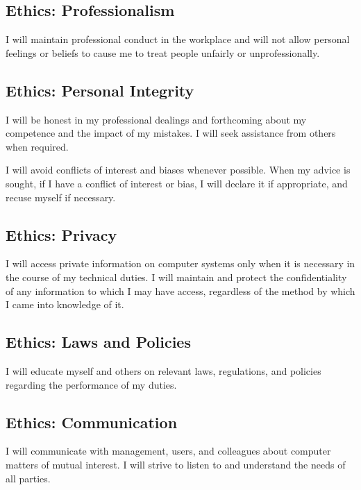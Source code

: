 \documentclass[xga]{xdvislides}
\begin{document}
\subsection{Ethics: Professionalism}
\vfill
\begin{center}
I will maintain professional conduct in the workplace and will not allow
personal feelings or beliefs to cause me to treat people unfairly or
unprofessionally.
\end{center}
\vfill

\subsection{Ethics: Personal Integrity}
\vfill
\begin{center}
I will be honest in my professional dealings and forthcoming about my
competence and the impact of my mistakes. I will seek assistance from
others when required. \\
\vspace{.5in}

I will avoid conflicts of interest and biases whenever possible. When my
advice is sought, if I have a conflict of interest or bias, I will declare
it if appropriate, and recuse myself if necessary.
\end{center}
\vfill


\subsection{Ethics: Privacy}
\vfill
\begin{center}
I will access private information on computer systems only when it is
necessary in the course of my technical duties. I will maintain and
protect the confidentiality of any information to which I may have access,
regardless of the method by which I came into knowledge of it.
\end{center}
\vfill

\subsection{Ethics: Laws and Policies}
\vfill
\begin{center}
I will educate myself and others on relevant laws, regulations, and
policies regarding the performance of my duties.
\end{center}
\vfill

\subsection{Ethics: Communication}
\vfill
\begin{center}
I will communicate with management, users, and colleagues about computer
matters of mutual interest. I will strive to listen to and understand the
needs of all parties.
\end{center}
\vfill
\end{document}
